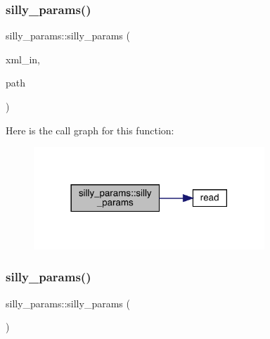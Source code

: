 \mbox{\label{structsilly__params_ac35c06fe1d98266d231e8315a2f0a5b6}} 
\subsubsection{\texorpdfstring{silly\_params()}{silly\_params()}\hspace{0.1cm}{\footnotesize\ttfamily [2/4]}}
{\footnotesize\ttfamily silly\+\_\+params\+::silly\+\_\+params (\begin{DoxyParamCaption}\item[{X\+M\+L\+Reader \&}]{xml\+\_\+in,  }\item[{const string \&}]{path }\end{DoxyParamCaption})}

Here is the call graph for this function\+:
\nopagebreak
\begin{figure}[H]
\begin{center}
\leavevmode
\includegraphics[width=246pt]{d2/dd5/structsilly__params_ac35c06fe1d98266d231e8315a2f0a5b6_cgraph}
\end{center}
\end{figure}
\mbox{\label{structsilly__params_af6ada23045b279ed7b0853b4017dd286}} 
\subsubsection{\texorpdfstring{silly\_params()}{silly\_params()}\hspace{0.1cm}{\footnotesize\ttfamily [3/4]}}
{\footnotesize\ttfamily silly\+\_\+params\+::silly\+\_\+params (\begin{DoxyParamCaption}{ }\end{DoxyParamCaption})\hspace{0.3cm}{\ttfamily [inline]}}

